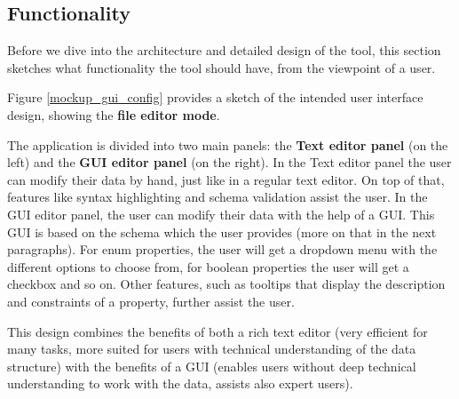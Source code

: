 
\subsection{Functionality}\label{subsec:functionality} %
Before we dive into the architecture and detailed design of the tool, this section sketches what functionality the tool should have, from the viewpoint of a user.

Figure \ref{mockup_gui_config} provides a sketch of the intended user interface design, showing the \textbf{file editor mode}. 

The application is divided into two main panels: the  \textbf{Text editor panel} (on the left) and the \textbf{GUI editor panel} (on the right).
In the Text editor panel the user can modify their data by hand, just like in a regular text editor. 
On top of that, features like syntax highlighting and schema validation assist the user.
In the GUI editor panel, the user can modify their data with the help of a GUI. 
This GUI is based on the schema which the user provides (more on that in the next paragraphs). 
For enum properties, the user will get a dropdown menu with the different options to choose from, for boolean properties the user will get a checkbox and so on. 
Other features, such as tooltips that display the description and constraints of a property, further assist the user.

This design combines the benefits of both a rich text editor (very efficient for many tasks, more suited for users with technical understanding of the data structure) with the benefits of a GUI (enables users without deep technical understanding to work with the data, assists also expert users).


